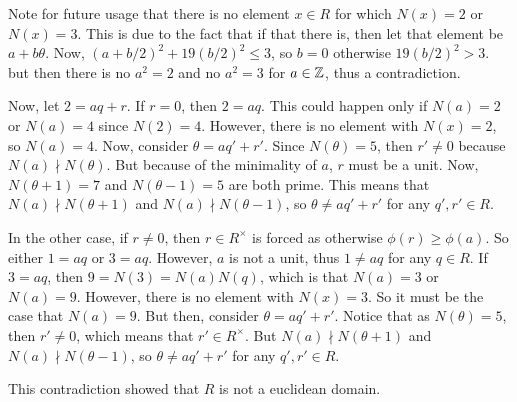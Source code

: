 \documentclass{report}
\begin{document}
{    Note for future usage that there is no element $x \in R$ for which $N(x) = 2$ or $N(x) = 3$. 
    This is due to the fact that if that there is, then let that element be $a + b\theta$. 
    Now, $(a + b/2)^2 + 19(b/2)^2 \le 3$, so $b = 0$ otherwise $19(b/2)^2 > 3$. but then there is no $a^2 = 2$
    and no $a^2 = 3$ for $a \in \mathbb{Z}$, thus a contradiction.

    Now, let $2 = aq + r$. If $r = 0$, then $2 = aq$. This could happen only if $N(a) = 2$ or $N(a) = 4$ since $N(2) = 4$.
    However, there is no element with $N(x) = 2$, so $N(a) = 4$. Now, consider $\theta = aq' + r'$. 
    Since $N(\theta) = 5$, then $r' \ne 0$ because $N(a) \nmid N(\theta)$.
    But because of the minimality of $a$, $r$ must be a unit. Now, $N(\theta + 1) = 7$ and $N(\theta - 1) = 5$ are both prime.
    This means that $N(a) \nmid N(\theta + 1)$ and $N(a) \nmid N(\theta - 1)$, so $\theta \ne aq' + r'$ for any $q', r' \in R$.

    In the other case, if $r \ne 0$, then $r \in R^\times$ is forced as otherwise $\phi(r) \ge \phi(a)$.
    So either $1 = aq$ or $3 = aq$. However, $a$ is not a unit, thus $1 \ne aq$ for any $q \in R$.
    If $3 = aq$, then $9 = N(3) = N(a)N(q)$, which is that $N(a) = 3$ or $N(a) = 9$. However, there is no element with $N(x) = 3$. 
    So it must be the case that $N(a) = 9$.
    But then, consider $\theta = aq' + r'$. Notice that as $N(\theta) = 5$, then $r' \ne 0$, which means that $r' \in R^\times$.
    But $N(a) \nmid N(\theta + 1)$ and $N(a) \nmid N(\theta - 1)$, so $\theta \ne aq' + r'$ for any $q', r' \in R$. 

    This contradiction showed that $R$ is not a euclidean domain.
  }
\end{document}
